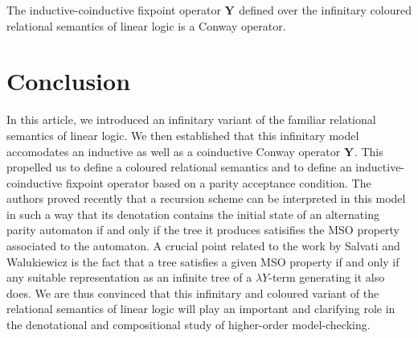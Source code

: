 \documentclass[runningheads,a4paper]{llncs}
\newcommand{\fixpoint}[1]{\textbf{Y}_{#1}}
\begin{document}
\begin{theorem}
The inductive-coinductive fixpoint operator $\fixpoint{}$ defined over the infinitary coloured relational semantics of linear logic
is a Conway operator.
\end{theorem}

\section{Conclusion}\label{section/conclusion}

In this article, we introduced an infinitary variant of the familiar relational semantics of linear logic.
We then established that this infinitary model accomodates an inductive as well as a coinductive Conway operator $\fixpoint{}$.
This propelled us to define a coloured relational semantics and to define an inductive-coinductive fixpoint operator
based on a parity acceptance condition.
The authors proved recently \cite{coloured-tensorial-logic} that a recursion scheme can be interpreted in this model in such a way 
that its denotation contains the initial state of an alternating parity automaton if and only if the tree 
it produces satisifies the MSO property associated to the automaton. 
A crucial point related to the work by Salvati and Walukiewicz \cite{salvati-walukiewicz1}
is the fact that a tree satisfies a given MSO property if and only if any suitable representation 
as an infinite tree of a $\lambda Y$-term generating it also does.
We are thus convinced that this infinitary and coloured variant of the relational semantics of linear logic
will play an important and clarifying role in the denotational and compositional study of higher-order model-checking.




\end{document}

